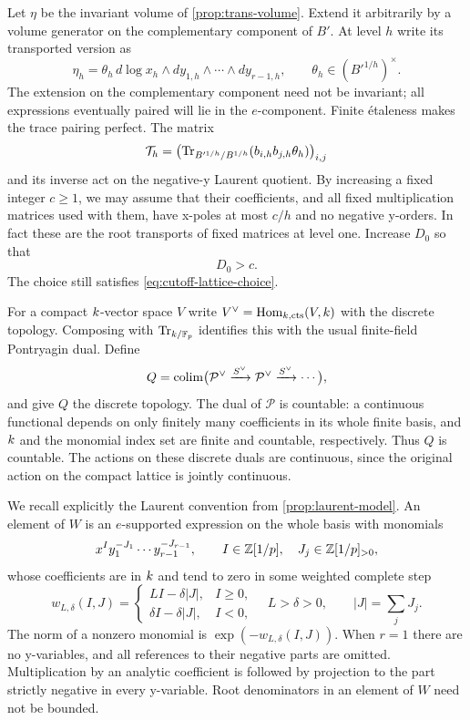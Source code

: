 Let $\eta$ be the invariant volume of \cref{prop:trans-volume}.  Extend
it arbitrarily by a volume generator on the complementary component of
$B'$.  At level $h$ write its transported version as
\[
 \eta_h=\theta_h\,d\log x_h\wedge
       dy_{1,h}\wedge\cdots\wedge dy_{r-1,h},
 \qquad \theta_h\in (B'^{1/h})^\times.
\]
The extension on the complementary component need not be invariant;
all expressions eventually paired will lie in the $e$-component.
Finite étaleness makes the trace pairing perfect.  The matrix
\begin{equation}
 \mathcal T_h=
 \bigl(\operatorname{Tr}_{B'^{1/h}/B^{1/h}}
             (b_{i,h}b_{j,h}\theta_h)\bigr)_{i,j}
 \label{eq:cutoff-trace-matrix}
\end{equation}
and its inverse act on the negative-y Laurent quotient.
By increasing a fixed integer $c\geq1$, we may assume that their
coefficients, and all fixed multiplication matrices used with them,
have x-poles at most $c/h$ and no negative y-orders.  In fact these are
the root transports of fixed matrices at level one.  Increase $D_0$ so
that
\begin{equation}
 D_0>c.
 \label{eq:cutoff-residue-margin}
\end{equation}
The choice still satisfies \cref{eq:cutoff-lattice-choice}.

For a compact $k$-vector space $V$ write
$V^\vee=\operatorname{Hom}_{k,\mathrm{cts}}(V,k)$ with the discrete topology.
Composing with $\operatorname{Tr}_{k/\mathbb F_p}$ identifies this with the usual
finite-field Pontryagin dual.  Define
\begin{equation}
 Q=\operatorname*{colim}\bigl(
       \mathcal P^\vee\xrightarrow{S^\vee}\mathcal P^\vee
       \xrightarrow{S^\vee}\cdots\bigr),
 \label{eq:cutoff-Q}
\end{equation}
and give $Q$ the discrete topology.  The dual of $\mathcal P$ is
countable: a continuous functional depends on only finitely many
coefficients in its whole finite basis, and $k$ and the monomial
index set are finite and countable, respectively.  Thus $Q$ is
countable.  The actions on these discrete duals are continuous, since
the original action on the compact lattice is jointly continuous.

We recall explicitly the Laurent convention from
\cref{prop:laurent-model}.  An element of $W$ is an $e$-supported
expression on the whole basis with monomials
\[
 x^I y_1^{-J_1}\cdots y_{r-1}^{-J_{r-1}},
 \qquad I\in\mathbb Z[1/p],\quad
 J_j\in\mathbb Z[1/p]_{>0},
\]
whose coefficients are in $k$ and tend to zero in some weighted
complete step
\begin{equation}
 w_{L,\delta}(I,J)=
 \begin{cases}
 LI-\delta|J|,&I\geq0,\\
 \delta I-\delta|J|,&I<0,
 \end{cases}
 \quad L>\delta>0,
 \qquad |J|=\sum_jJ_j.
 \label{eq:cutoff-weight}
\end{equation}
The norm of a nonzero monomial is $\exp(-w_{L,\delta}(I,J))$.
When $r=1$ there are no y-variables, and all references to their
negative parts are omitted.  Multiplication by an analytic coefficient
is followed by projection to the part strictly negative in every
y-variable.  Root denominators in an element of $W$ need not be
bounded.

